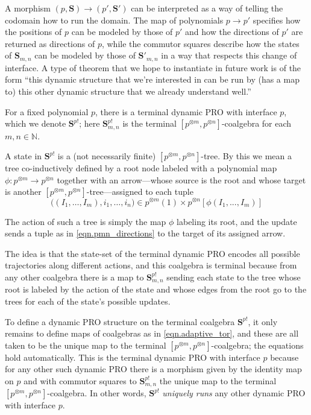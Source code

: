 \documentclass{eptcs}
\theoremstyle{definition}
\theoremstyle{plain}
\newenvironment{example}
  {\pushQED{\qed}\renewcommand{\qedsymbol}{$\lozenge$}\examplex}
  {\popQED\endexamplex}
\newcommand{\Cat}[1]{\textbf{#1}}%
\newcommand{\nn}{\mathbb{N}}
\newcommand{\0}{\textsf{0}}
\newcommand{\1}{\tn{\textsf{1}}}
\renewcommand{\S}{{\Cat{S}}}
\begin{document}
A morphism $(p,\S) \to (p',\S')$ can be interpreted as a way of telling the codomain how to run the domain. The map of polynomials $p \to p'$ specifies how the positions of $p$ can be modeled by those of $p'$ and how the directions of $p'$ are returned as directions of $p$, while the commutor squares describe how the states of $\S_{m,n}$ can be modeled by those of $\S'_{m,n}$ in a way that respects this change of interface. A type of theorem that we hope to instantiate in future work is of the form ``this dynamic structure that we're interested in can be run by (has a map to) this other dynamic structure that we already understand well.''

\begin{example}
For a fixed polynomial $p$, there is a terminal dynamic PRO with interface $p$, which we denote $\S^{p!}$; here $\S^{p!}_{m,n}$ is the terminal $[p^{\otimes m},p^{\otimes n}]$-coalgebra for each $m,n\in\nn$. 

A state in $\S^{p!}$ is a (not necessarily finite) $[p^{\otimes m},p^{\otimes n}]$-tree. By this we mean a tree co-inductively defined by a root node labeled with a polynomial map $\phi\colon p^{\otimes m} \to p^{\otimes n}$ together with an arrow---whose source is the root and whose target is another $[p^{\otimes m},p^{\otimes n}]$-tree---assigned to each tuple 
\begin{equation}\label{eqn.pmn_directions}
\big((I_1,\ldots,I_m), i_1,\ldots,i_n\big) \in  p^{\otimes m}(1)\times p^{\otimes n}[\phi(I_1,...,I_m)] 
\end{equation}

The action of such a tree is simply the map $\phi$ labeling its root, and the update sends a tuple as in \eqref{eqn.pmn_directions} to the target of its assigned arrow. 

The idea is that the state-set of the terminal dynamic PRO encodes all possible trajectories along different actions, and this coalgebra is terminal because from any other coalgebra there is a map to $\S^{p!}_{m,n}$ sending each state to the tree whose root is labeled by the action of the state and whose edges from the root go to the trees for each of the state's possible updates.

To define a dynamic PRO structure on the terminal coalgebra $\S^{p!}$, it only remains to define maps of coalgebras as in \cref{eqn.adaptive_tor}, and these are all taken to be the unique map to the terminal $[p^{\otimes m},p^{\otimes n}]$-coalgebra; the equations hold automatically. This is the terminal dynamic PRO with interface $p$ because for any other such dynamic PRO there is a morphism given by the identity map on $p$ and with commutor squares to $\S^{p!}_{m,n}$ the unique map to the terminal $[p^{\otimes m},p^{\otimes n}]$-coalgebra. In other words, $\S^{p!}$ \emph{uniquely runs} any other dynamic PRO with interface $p$.
\end{example}
\end{document}
